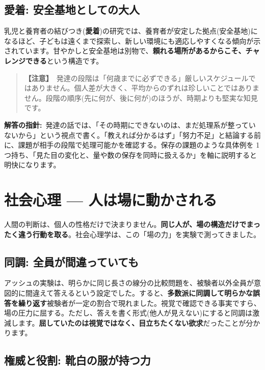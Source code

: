 \documentclass{article}
\begin{document}
\subsection{愛着: 安全基地としての大人}

乳児と養育者の結びつき(\textbf{愛着})の研究では、養育者が安定した拠点(安全基地)になるほど、子どもは遠くまで探索し、新しい環境にも適応しやすくなる傾向が示されています。甘やかしと安全基地は別物で、\textbf{頼れる場所があるからこそ、チャレンジできる}という構造です。

\begin{quote}
\textbf{【注意】}\ 発達の段階は「何歳までに必ずできる」厳しいスケジュールではありません。個人差が大きく、平均からのずれは珍しいことではありません。段階の順序(先に何が、後に何が)のほうが、時期よりも堅実な知見です。
\end{quote}

\textbf{解答の指針:}\ 発達の話では、「その時期にできないのは、まだ処理系が整っていないから」という視点で書く。「教えれば分かるはず」「努力不足」と結論する前に、課題が相手の段階で処理可能かを確認する。保存の課題のような具体例を 1 つ持ち、「見た目の変化と、量や数の保存を同時に扱えるか」を軸に説明すると明快になります。

\section{社会心理 — 人は場に動かされる}

人間の判断は、個人の性格だけで決まりません。\textbf{同じ人が、場の構造だけでまったく違う行動を取る}。社会心理学は、この「場の力」を実験で測ってきました。

\subsection{同調: 全員が間違っていても}

アッシュの実験は、明らかに同じ長さの線分の比較問題を、被験者以外全員が意図的に間違えて答えるという設定でした。すると、\textbf{多数派に同調して明らかな誤答を繰り返す}被験者が一定の割合で現れました。視覚で確認できる事実ですら、場の圧力に屈する。ただし、答えを書く形式(他人が見えない)にすると同調は激減します。\textbf{屈していたのは視覚ではなく、目立ちたくない欲求}だったことが分かります。

\subsection{権威と役割: 靴白の服が持つ力}
\end{document}
